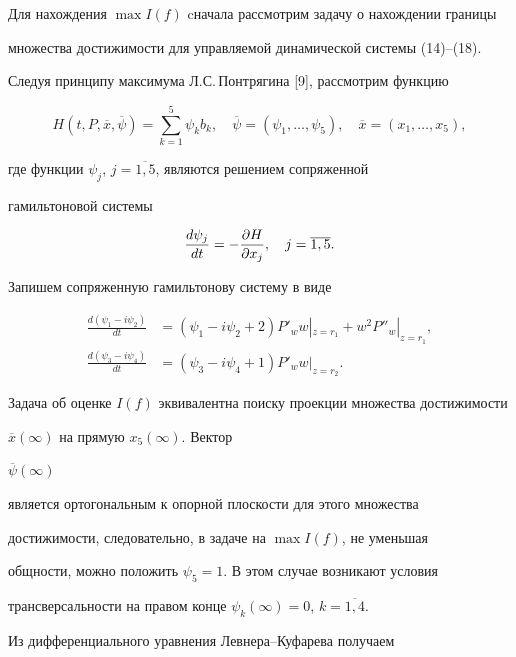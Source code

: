 Для нахождения $\max I(f)$ cначала рассмотрим задачу о нахождении границы


множества достижимости для управляемой динамической системы (14)--(18).


Следуя принципу максимума Л.С.\,Понтрягина [9], рассмотрим функцию


$$


H(t,P,\overline x,\overline \psi)=\sum_{k=1}^5 \psi_kb_k,\quad


\overline \psi=(\psi_1,\dotsc, \psi_5),\quad


\overline x=(x_1,\dotsc, x_5 ),


$$


где функции $\psi_j$, $j=\overline{1, 5}$, являются решением сопряженной


гамильтоновой системы


$$


\frac {d\psi_j}{dt} =-\pde{H}{x_j},\quad j=\overline{1, 5}.


$$





Запишем сопряженную гамильтонову систему в виде


\begin{align*}


\frac{d(\psi_1-i\psi_2)}{dt} &=(\psi_1-i\psi_2+2)P'_ww|_{z=r_1}


+ w^2P''_w|_{z=r_1}, \\


%


\frac{d(\psi_3-i\psi_4)}{dt}&=(\psi_3-i\psi_4 + 1)P'_ww|_{z=r_2}.


\end{align*}


Задача об оценке $I(f)$ эквивалентна поиску проекции множества достижимости


$\overline x(\infty)$ на прямую $x_5(\infty)$. Вектор


$\overline \psi(\infty)$


является ортогональным к опорной плоскости для этого множества


достижимости, следовательно, в задаче на $\max I(f)$, не уменьшая


общности, можно положить $\psi_5=1$. В этом случае возникают условия


трансверсальности на правом конце $\psi_k(\infty)=0$, $k=\overline{1,4}$.





Из дифференциального уравнения Левнера--Куфарева получаем


